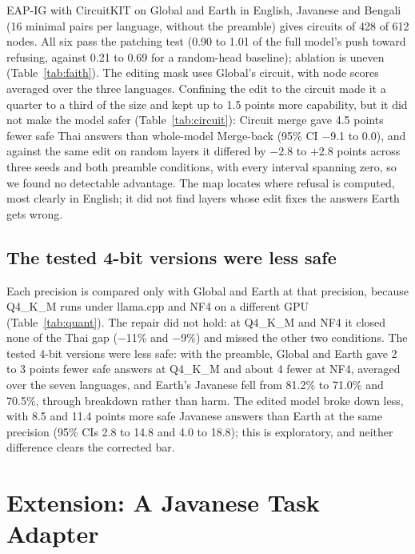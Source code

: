 \documentclass[11pt]{article}
\begin{document}
EAP-IG with CircuitKIT on Global and Earth in English, Javanese and Bengali (16 minimal pairs per language, without
the preamble) gives circuits of 428 of 612 nodes. All six pass the patching test (0.90 to 1.01 of the full model's
push toward refusing, against 0.21 to 0.69 for a random-head baseline); ablation is uneven (Table~\ref{tab:faith}). The editing mask uses Global's circuit, with
node scores averaged over the three languages. Confining the edit to the circuit made it a quarter to a third of the
size and kept up to 1.5 points more capability, but it did not make the model safer (Table~\ref{tab:circuit}): Circuit
merge gave 4.5 points fewer safe Thai answers than whole-model Merge-back (95\% CI $-$9.1 to 0.0), and against the
same edit on random layers it differed by $-$2.8 to $+$2.8 points across three seeds and both preamble conditions,
with every interval spanning zero, so we found no detectable advantage. The map locates where refusal is computed, most clearly in English; it did not
find layers whose edit fixes the answers Earth gets wrong.

\subsection{The tested 4-bit versions were less safe}\label{sec:quant}

Each precision is compared only with Global and Earth at that precision, because Q4\_K\_M runs under llama.cpp
and NF4 on a different GPU (Table~\ref{tab:quant}). The repair did not hold: at Q4\_K\_M and NF4 it closed none of the
Thai gap ($-$11\% and $-$9\%) and missed the other two conditions. The tested 4-bit versions were less safe: with the
preamble, Global and Earth gave 2 to 3 points fewer safe answers at Q4\_K\_M and about 4 fewer at NF4, averaged over
the seven languages, and Earth's Javanese fell from 81.2\% to 71.0\% and 70.5\%, through breakdown rather than harm.
The edited model broke
down less, with 8.5 and 11.4 points more safe Javanese answers than Earth at the same precision (95\% CIs 2.8 to 14.8
and 4.0 to 18.8); this is exploratory, and neither difference clears the corrected bar.

\section{Extension: A Javanese Task Adapter}\label{sec:adapt}
\end{document}
